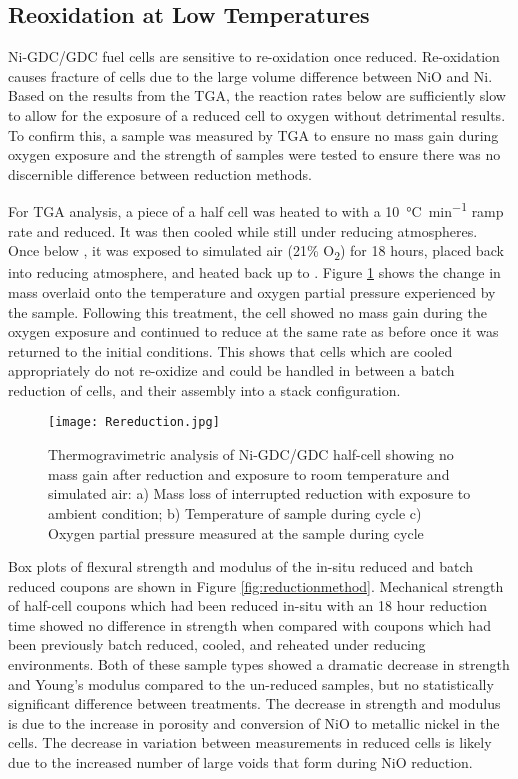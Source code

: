 \subsection{Reoxidation at Low Temperatures}
Ni-GDC/GDC fuel cells are sensitive to re-oxidation once reduced.
Re-oxidation causes fracture of cells due to the large volume difference between NiO and Ni.\cite{Nakajo2012}
Based on the results from the TGA, the reaction rates below  are sufficiently slow to allow for the exposure of a reduced cell to oxygen without detrimental results.\cite{Richardson2003}
To confirm this, a sample was measured by TGA to ensure no mass gain during oxygen exposure and the strength of samples were tested to ensure there was no discernible difference between reduction methods.

For TGA analysis, a piece of a half cell was heated to  with a \SI{10}{\celsius\per\minute} ramp rate and reduced.
It was then cooled while still under reducing atmospheres.
Once below , it was exposed to simulated air
(21\% O\textsubscript{2}) for 18 hours, placed back into reducing atmosphere, and heated back up to .
Figure \ref{fig:rereduction} shows the change in mass overlaid onto the temperature and oxygen partial pressure experienced by the sample.
Following this treatment, the cell showed no mass gain during the oxygen exposure and continued to reduce at the same rate as before once it was returned to the initial conditions.
This shows that cells which are cooled appropriately do not re-oxidize and could be handled in between a batch reduction of cells, and their assembly into a stack configuration.

\begin{figure}
    \texttt{[image: Rereduction.jpg]}
    \caption{Thermogravimetric analysis of Ni-GDC/GDC half-cell showing no mass gain after reduction and exposure to room temperature and simulated air: a) Mass loss of interrupted reduction with exposure to ambient condition; b) Temperature of sample during cycle c) Oxygen partial pressure measured at the sample during cycle}
    \label{fig:rereduction}
\end{figure}

Box plots of flexural strength and modulus of the in-situ reduced and batch reduced coupons are shown in Figure \ref{fig:reductionmethod}.
Mechanical strength of half-cell coupons which had been reduced in-situ with an 18 hour reduction time showed no difference in strength when compared with coupons which had been previously batch reduced, cooled, and reheated under reducing environments.
Both of these sample types showed a dramatic decrease in strength and Young's modulus compared to the un-reduced samples, but no statistically significant difference between treatments.
The decrease in strength and modulus is due to the increase in porosity and conversion of NiO to metallic nickel in the cells.
The decrease in variation between measurements in reduced cells is likely due to the increased number of large voids that form during NiO reduction.

